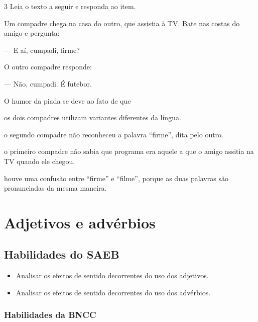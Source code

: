 \num{3} Leia o texto a seguir e responda ao item.

\begin{myquote}
Um compadre chega na casa do outro, que assistia à TV. Bate nas costas do amigo e pergunta:

--- E aí, cumpadi, firme?

O outro compadre responde:

--- Não, cumpadi. É futebor.

\end{myquote}

O humor da piada se deve ao fato de que

\begin{escolha}[itemsep=-5pt]
\item os dois compadres utilizam variantes diferentes da língua.

\item o segundo compadre não reconheceu a palavra ``firme'', dita pelo outro.

\item o primeiro compadre não sabia que programa era aquele a que o amigo assitia na TV quando ele chegou.

\item houve uma confusão entre ``firme'' e ``filme'', porque as duas palavras são pronunciadas da mesma maneira.
\end{escolha}

\chapter{Adjetivos e advérbios}


\section{Habilidades do SAEB}

\begin{itemize}
  \item Analisar os efeitos de sentido decorrentes do uso dos adjetivos.
  \item Analisar os efeitos de sentido decorrentes do uso dos advérbios.
\end{itemize}

\subsection{Habilidades da BNCC}

